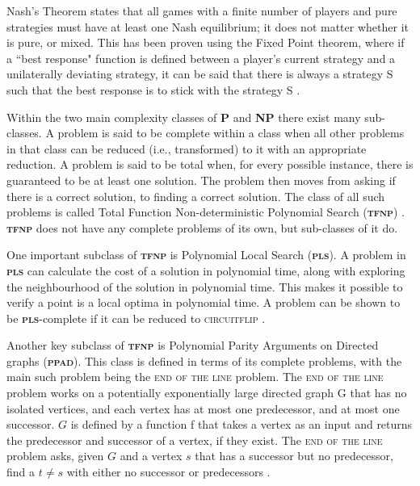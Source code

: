 \documentclass{article}
\begin{document}
\begin{multicols}{2}
Nash’s Theorem states that all games with a finite number of players and pure strategies must have at least one Nash equilibrium; it does not matter whether it is pure, or mixed. This has been proven using the Fixed Point theorem, where if a ``best response" function is defined between a player’s current strategy and a unilaterally deviating strategy, it can be said that there is always a strategy S such that the best response is to stick with the strategy S \cite{NashJohnF..1950}.

Within the two main complexity classes of \textbf{\textsc{P}} and \textbf{\textsc{NP}} there exist many sub-classes. A problem is said to be complete within a class when all other problems in that class can be reduced (i.e., transformed) to it with an appropriate reduction. A problem is said to be total when, for every possible instance, there is guaranteed to be at least one solution. The problem then moves from asking if there is a correct solution, to finding a correct solution. The class of all such problems is called Total Function Non-deterministic Polynomial Search (\textbf{\textsc{tfnp}}) \cite{Wigderson.2019}. \textbf{\textsc{tfnp}} does not have any complete problems of its own, but sub-classes of it do.

One important subclass of \textbf{\textsc{tfnp}} is Polynomial Local Search (\textbf{\textsc{pls}}). A problem in \textbf{\textsc{pls}} can calculate the cost of a solution in polynomial time, along with exploring the neighbourhood of the solution in polynomial time. This makes it possible to verify a point is a local optima in polynomial time. A problem can be shown to be \textbf{\textsc{pls}}-complete if it can be reduced to \textsc{circuitflip} \cite{Borzechowski.19thSeptember2016}.

Another key subclass of \textbf{\textsc{tfnp}} is Polynomial Parity Arguments on Directed graphs (\textbf{\textsc{ppad}}). This class is defined in terms of its complete problems, with the main such problem being the \textsc{end of the line} problem. The \textsc{end of the line} problem works on a potentially exponentially large directed graph G that has no isolated vertices, and each vertex has at most one predecessor, and at most one successor. $G$ is defined by a function f that takes a vertex as an input and returns the predecessor and successor of a vertex, if they exist. The \textsc{end of the line} problem asks, given $G$ and a vertex $s$ that has a successor but no predecessor, find a $t \neq s$ with either no successor or predecessors \cite{PapadimitriouChristosH..}.




\end{multicols}
\end{document}

